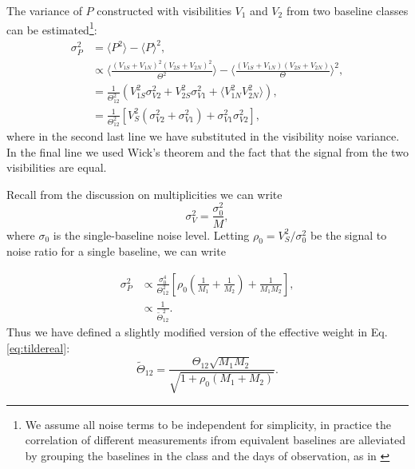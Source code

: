 \documentclass[twocolumn,apj,numberedappendix]{emulateapj}
\renewcommand\[{\begin{equation}}
\renewcommand\]{\end{equation}}
\begin{document}
The variance of $P$ constructed with visibilities $V_1$ and $V_2$ from two baseline classes can be estimated\footnote{We assume all noise terms to be independent for simplicity, in practice the correlation of different measurements ifrom equivalent baselines are alleviated by grouping the baselines in the class and the days of observation, as in \cite{Ali2015}}:
\begin{equation}
\begin{aligned}
\sigma_P^2 &= \langle P^2\rangle -\langle P \rangle^2,\\
&\propto \langle \frac{(V_{1S}+V_{1N})^2 (V_{2S}+V_{2N})^2}{\Theta^2} \rangle - \langle \frac{(V_{1S}+V_{1N}) (V_{2S}+V_{2N})}{\Theta} \rangle ^2,\\
&= \frac{1}{\Theta_{12}^2} \left( V_{1S}^2\sigma_{V2}^2+V_{2S}^2\sigma_{V1}^2+\langle V_{1N}^2 V_{2N}^2\rangle\right), \\
&= \frac{1}{\Theta_{12}^2} \left[ V_{S}^2(\sigma_{V2}^2+\sigma_{V1}^2) + \sigma_{V1}^2 \sigma_{V2}^2\right], 
\end{aligned}
\end{equation}
where in the second last line we have substituted in the visibility noise variance. In the final line we used Wick's theorem and the fact that the signal from the two visibilities are equal. 

Recall from the discussion on multiplicities we can write
\begin{equation}
\sigma_V^2=\frac{\sigma_0^2}{M},
\end{equation}
where $\sigma_0$ is the single-baseline noise level. Letting $\rho_0=V_S^2/\sigma_0^2$ be the signal to noise ratio for a single baseline, we can write

\begin{equation}
\begin{aligned}
\sigma_P^2 & \propto  \frac{\sigma_0^4}{\Theta_{12}^2} \left[ \rho_0 \left(\frac{1}{M_1}+\frac{1}{M_2} \right) + \frac{1}{M_1 M_2}\right], \\
&\propto \frac{1}{\widetilde{\Theta}_{12}^2}.
\end{aligned}
\end{equation}
Thus we have defined a slightly modified version of the effective weight in Eq.  \eqref{eq:tildereal}:
\begin{equation}
\widetilde{\Theta}_{12}=\frac{\Theta_{12}\sqrt{M_1M_{2}}}{\sqrt{1 + \rho_0 \left(M_1+M_{2} \right)}}.
\end{equation}







\end{document}

